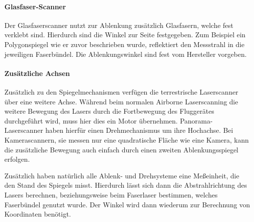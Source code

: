 \documentclass[a4paper,12pt,bibliography=totoc, listof=totoc,titlepage,pointlessnumbers]{scrreprt}
\begin{document}
\paragraph{Glasfaser-Scanner}
Der Glasfaserscanner nutzt zur Ablenkung zusätzlich Glasfasern, welche fest verklebt sind. Hierdurch sind die Winkel zur Seite festgegeben. Zum Beispiel ein Polygonspiegel wie er zuvor beschrieben wurde, reflektiert den Messstrahl in die jeweiligen Faserbündel. Die Ablenkungswinkel sind fest vom Hersteller vorgeben.

\paragraph{Zusätzliche Achsen}
Zusätzlich zu den Spiegelmechanismen verfügen die terrestrische Laserscanner über eine weitere Achse. Während beim normalen Airborne Laserscanning die weitere Bewegung des Lasers durch die Fortbewegung des Fluggerätes durchgeführt wird, muss hier dies ein Motor übernehmen. Panorama-Laserscanner haben hierfür einen Drehmechanismus um ihre Hochachse. Bei Kamerascannern, sie messen nur eine quadratische Fläche wie eine Kamera, kann die zusätzliche Bewegung auch einfach durch einen zweiten Ablenkungsspiegel erfolgen. \citep[S. 37]{beraldin}

Zusätzlich haben natürlich alle Ablenk- und Drehsysteme eine Meßeinheit, die den Stand des Spiegels misst. Hierdurch lässt sich dann die Abstrahlrichtung des Lasers berechnen, beziehungsweise beim Faserlaser bestimmen, welches Faserbündel genutzt wurde. Der Winkel wird dann wiederum zur Berechnung von Koordinaten benötigt.

\end{document}
